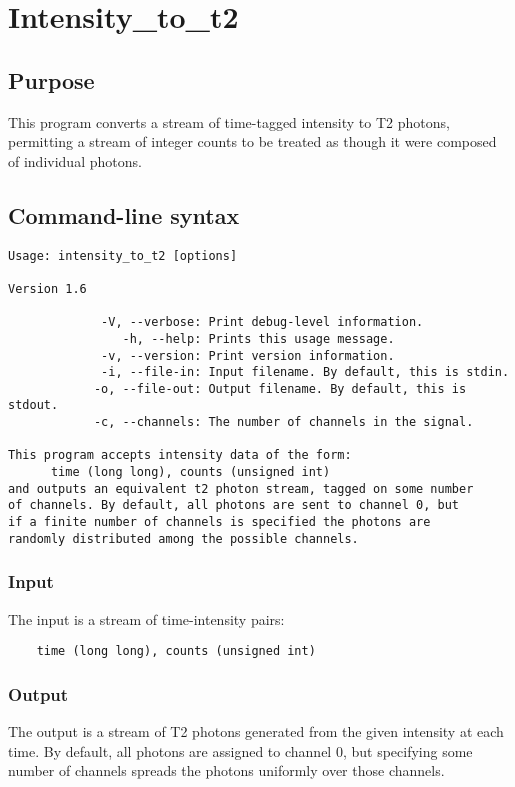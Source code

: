 \section{Intensity\_to\_t2}
\subsection{Purpose}
This program converts a stream of time-tagged intensity to T2 photons, permitting a stream of integer counts to be treated as though it were composed of individual photons.

\subsection{Command-line syntax}
\begin{verbatim}
Usage: intensity_to_t2 [options]

Version 1.6

             -V, --verbose: Print debug-level information.
                -h, --help: Prints this usage message.
             -v, --version: Print version information.
             -i, --file-in: Input filename. By default, this is stdin.
            -o, --file-out: Output filename. By default, this is stdout.
            -c, --channels: The number of channels in the signal.

This program accepts intensity data of the form:
      time (long long), counts (unsigned int)
and outputs an equivalent t2 photon stream, tagged on some number
of channels. By default, all photons are sent to channel 0, but 
if a finite number of channels is specified the photons are 
randomly distributed among the possible channels.
\end{verbatim}

\subsubsection{Input}
The input is a stream of time-intensity pairs:
\begin{verbatim}
    time (long long), counts (unsigned int)
\end{verbatim}

\subsubsection{Output}
The output is a stream of T2 photons generated from the given intensity at each time. By default, all photons are assigned to channel 0, but specifying some number of channels spreads the photons uniformly over those channels.

